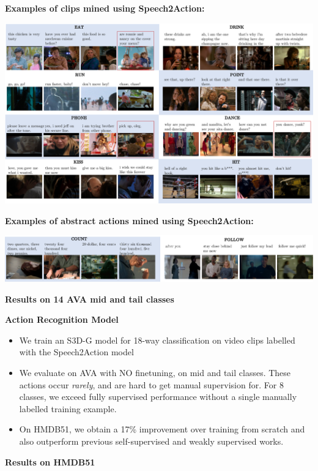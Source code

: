 \documentclass[landscape,a0paper,fontscale=0.292]{baposter}
\begin{document}
\begin{poster}
{    \vspace{0.5em}
    \textbf{\color{blue}Examples of clips mined using Speech2Action:}
    \begin{center}
        \vspace{-0.8em}
        \includegraphics[width=0.9\linewidth]{images/mining_cropped.pdf}
        \vspace{-1em}
    \end{center}
\textbf{\color{blue}Examples of abstract actions mined using Speech2Action:}
    \begin{center}
     \vspace{-0.8em}
    \includegraphics[width=0.92\linewidth]{images/mining_unusual.pdf}
    \vspace{-1em}
   \end{center}
    \vspace{0.5em}
    {\bf\color{blue}Results on 14 AVA mid and tail classes}
    \vspace{0.2em}
    
    
\begin{minipage}{0.5\linewidth}
{\bf\color{blue}Action Recognition Model}
\begin{itemize}
    \item We train an S3D-G model for 18-way classification on video clips labelled with the Speech2Action model 
    \item We evaluate on AVA with NO finetuning, on mid and tail classes. These actions occur \textit{rarely}, and are hard to get manual supervision for. For 8 classes, we exceed fully supervised performance without a single manually labelled training example.
    \item On HMDB51, we obtain a 17\% improvement over training from scratch and also outperform previous self-supervised and weakly supervised works.
\end{itemize}
\end{minipage}   
\begin{minipage}{0.5\linewidth}
    \vspace{1em}
{\bf\color{blue} \quad Results on HMDB51}
\vspace{-0.3em}
\begin{flushright}

\end{flushright}
 

\end{minipage}}
\end{poster}
\end{document}
